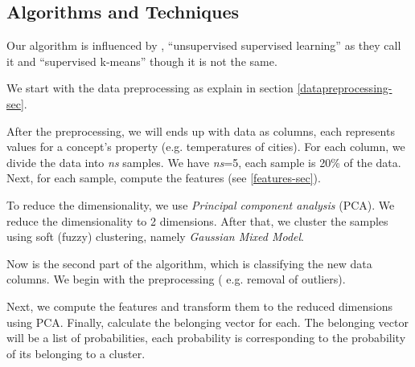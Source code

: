 \documentclass{article}
\newcommand{\comm}[2][inline]{\color{green} #2 \color{black}}
\begin{document}
\subsection{Algorithms and Techniques}


Our algorithm is influenced by \cite{unsupervised-supervised}, ``unsupervised supervised learning'' as they call it and \cite{supervised-k} ``supervised k-means'' though it is not the same.



We start with the data preprocessing as explain in section \ref{datapreprocessing-sec}.

After the preprocessing, we will ends up with data as columns, each represents values for a concept's property (e.g. temperatures of cities). For each column, we divide the data into \textit{ns} samples. We have \textit{ns}=5, each sample is 20\% of the data. Next, for each sample, compute the features (see \ref{features-sec}). %

To reduce the dimensionality, we use \textit{Principal component analysis} (PCA). We reduce the dimensionality to 2 dimensions. After that, we cluster the samples using soft (fuzzy) clustering, namely \textit{Gaussian Mixed Model}.

Now is the second part of the algorithm, which is classifying the new data columns. We begin with the preprocessing ( e.g. removal of outliers). 


 Next, we compute the features and transform them to the reduced dimensions using PCA. Finally, calculate the belonging vector for each. The belonging vector will be a list of probabilities, each probability is corresponding to the probability of its belonging to a cluster. 
 
 
  

\end{document}
